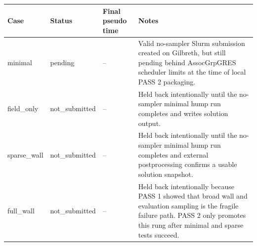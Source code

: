 \begin{tabular}{p{2.2cm} p{1.3cm} p{1.9cm} p{6.5cm}}
\toprule
Case & Status & Final pseudo time & Notes\\
\midrule
minimal & pending & -- & Valid no-sampler Slurm submission created on Gilbreth, but still pending behind AssocGrpGRES scheduler limits at the time of local PASS 2 packaging.\\
field\_only & not\_submitted & -- & Held back intentionally until the no-sampler minimal hump run completes and writes solution output.\\
sparse\_wall & not\_submitted & -- & Held back intentionally until the no-sampler minimal hump run completes and external postprocessing confirms a usable solution snapshot.\\
full\_wall & not\_submitted & -- & Held back intentionally because PASS 1 showed that broad wall and evaluation sampling is the fragile failure path. PASS 2 only promotes this rung after minimal and sparse tests succeed.\\
\bottomrule
\end{tabular}